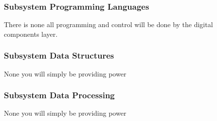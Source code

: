\subsubsection{Subsystem Programming Languages}
There is none all programming and control will be done by the digital components layer.

\subsubsection{Subsystem Data Structures}
None you will simply be providing power

\subsubsection{Subsystem Data Processing}
None you will simply be providing power
